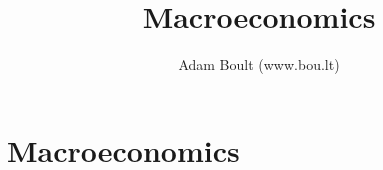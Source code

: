 \documentclass[oneside]{book}
\begin{document}
\author{Adam Boult (www.bou.lt)}
\title{Macroeconomics}
\maketitle

\setcounter{tocdepth}{0}
\tableofcontents



\part{Macroeconomics}







\end{document}
